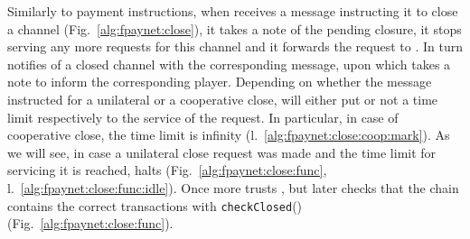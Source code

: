   Similarly to payment instructions, when \fpaynet{} receives a message
  instructing it to close a channel (Fig.~\ref{alg:fpaynet:close}), it takes a
  note of the pending closure, it stops serving any more requests for this
  channel and it forwards the request to \simulator. In turn \simulator{}
  notifies \fpaynet{} of a closed channel with the corresponding message, upon
  which \fpaynet{} takes a note to inform the corresponding player. Depending on
  whether the message instructed for a unilateral or a cooperative close,
  \fpaynet{} will either put or not a time limit respectively to the service of
  the request. In particular, in case of cooperative close, the time limit is
  infinity (l.~\ref{alg:fpaynet:close:coop:mark}). As we will see, in case a
  unilateral close request was made and the time limit for servicing it is
  reached, \fpaynet{} halts (Fig.~\ref{alg:fpaynet:close:func},
  l.~\ref{alg:fpaynet:close:func:idle}). Once more \fpaynet{} trusts \simulator,
  but later checks that the chain contains the correct transactions with
  \texttt{checkClosed}() (Fig.~\ref{alg:fpaynet:close:func}).

